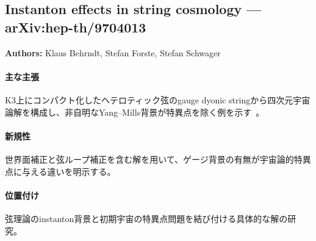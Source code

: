 \subsection{Instanton effects in string cosmology --- arXiv:hep-th/9704013}

\textbf{Authors:} Klaus Behrndt, Stefan Forste, Stefan Schwager

\paragraph{主な主張}
K3上にコンパクト化したヘテロティック弦のgauge dyonic stringから四次元宇宙論解を構成し、非自明なYang--Mills背景が特異点を除く例を示す~\cite{Behrndt:1997na}。

\paragraph{新規性}
世界面補正と弦ループ補正を含む解を用いて、ゲージ背景の有無が宇宙論的特異点に与える違いを明示する。

\paragraph{位置付け}
弦理論のinstanton背景と初期宇宙の特異点問題を結び付ける具体的な解の研究。
